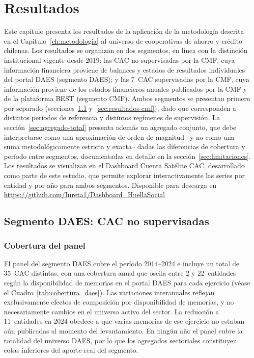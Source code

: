 
\chapter{Resultados}
\label{ch:resultados}

Este capítulo presenta los resultados de la aplicación de
la metodología descrita en el Capítulo~\ref{ch:metodologia}
al universo de cooperativas de ahorro y crédito chilenas.
Los resultados se organizan en dos segmentos, en línea con
la distinción institucional vigente desde 2019: las CAC
no supervisadas por la CMF, cuya información financiera
proviene de balances y estados de resultados individuales
del portal DAES (segmento DAES); y las 7~CAC supervisadas
por la CMF, cuya información proviene de los estados
financieros anuales publicados por la CMF y de la
plataforma BEST (segmento CMF). %
Ambos segmentos se presentan primero por separado (secciones~\ref{sec:resultados-daes}
y~\ref{sec:resultados-cmf}), dado que corresponden a distintos períodos de
referencia y distintos regímenes de supervisión. La
sección~\ref{sec:agregado-total} presenta además un agregado conjunto, que
debe interpretarse como una aproximación de orden de magnitud --y no como
una suma metodológicamente estricta y exacta-- dadas las diferencias de
cobertura y período entre segmentos, documentadas en detalle en la
sección~\ref{sec:limitaciones}.
Los resultados se visualizan en el Dashboard Cuenta
Satélite CAC, desarrollado como parte de
este estudio, que permite explorar interactivamente las
series por entidad y por año para ambos segmentos. Disponible para descarga en \url{https://github.com/Iureta1/Dashboard_HuellaSocial}

\section{Segmento DAES: CAC no supervisadas}
\label{sec:resultados-daes}

\subsection{Cobertura del panel}
\label{subsec:cobertura-daes}
El panel del segmento DAES cubre el período 2014–2024 e incluye un total de 35~CAC
distintas, con una cobertura anual que oscila entre 2 y 22~entidades según la
disponibilidad de memorias en el portal DAES para cada ejercicio
(véase el Cuadro~\ref{tab:cobertura_daes}). Las variaciones interanuales reflejan
exclusivamente efectos de composición por disponibilidad de memorias, y no
necesariamente cambios en el universo activo del sector. La reducción a
11~entidades en 2024 obedece a que varias memorias de ese ejercicio no estaban
aún publicadas al momento del levantamiento. En ningún año el panel cubre la
totalidad del universo DAES, por lo que los agregados sectoriales constituyen
cotas inferiores del aporte real del segmento.

